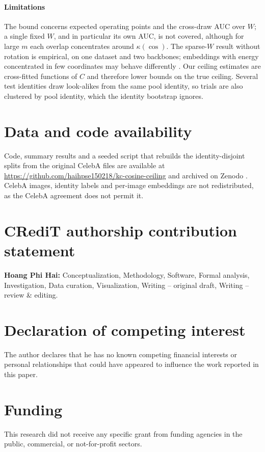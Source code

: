 \documentclass[preprint,12pt,authoryear]{elsarticle}
\theoremstyle{remark}
\begin{document}
\paragraph{Limitations} The bound concerns expected operating points and the cross-draw AUC over $W$; a single
fixed $W$, and in particular its own AUC, is not covered, although for large $m$ each overlap concentrates around
$\kappa(\cos)$. The sparse-$W$ result without rotation is empirical, on one dataset and two backbones; embeddings with energy
concentrated in few coordinates may behave differently \citep{kleyko2024}. Our ceiling estimates are cross-fitted
functions of $C$ and therefore lower bounds on the true ceiling. Several test identities draw look-alikes from
the same pool identity, so trials are also clustered by pool identity, which the identity bootstrap ignores.

\section*{Data and code availability}
Code, summary results and a seeded script that rebuilds the identity-disjoint splits from the original CelebA
files are available at \url{https://github.com/haihpse150218/kc-cosine-ceiling} and archived on Zenodo
\citep{hoang2026code}. CelebA images, identity labels and per-image
embeddings are not redistributed, as the CelebA agreement does not permit it.

\section*{CRediT authorship contribution statement}
\textbf{Hoang Phi Hai:} Conceptualization, Methodology, Software, Formal analysis, Investigation, Data curation,
Visualization, Writing -- original draft, Writing -- review \& editing.

\section*{Declaration of competing interest}
The author declares that he has no known competing financial interests or personal relationships that could
have appeared to influence the work reported in this paper.

\section*{Funding}
This research did not receive any specific grant from funding agencies in the public, commercial, or
not-for-profit sectors.
\end{document}
